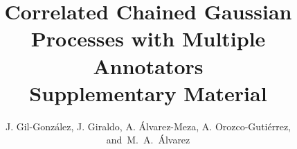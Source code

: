 \documentclass[9pt]{article}
\begin{document}
\title{Correlated Chained Gaussian Processes with Multiple Annotators\\
Supplementary Material}
%
%
%

\author{J. Gil-Gonz\'alez,
        J. Giraldo,
        A. \'Alvarez-Meza, A. Orozco-Guti\'errez,  and~M.~A.~\'Alvarez%
}
\date{}


\maketitle
\end{document}

